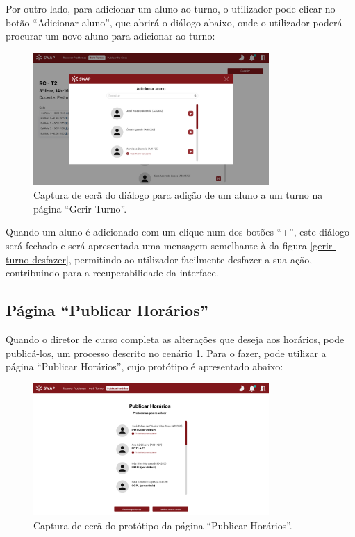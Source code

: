 \documentclass[12pt, a4paper]{article}
\begin{document}
Por outro lado, para adicionar um aluno ao turno, o utilizador pode clicar no botão
``Adicionar aluno'', que abrirá o diálogo abaixo, onde o utilizador poderá procurar um novo aluno
para adicionar ao turno:

\begin{figure}[H]
    \centering
    \includegraphics[width=0.8\textwidth]{res/prototype/gerir-turno-adicionar-aluno.png}
    \caption{
        \onehalfspacing
        Captura de ecrã do diálogo para adição de um aluno a um turno na página ``Gerir Turno''.
    }
    \label{gerir-turno-desfazer-adicionar-aluno}
\end{figure}

Quando um aluno é adicionado com um clique num dos botões ``+'', este diálogo será fechado e será
apresentada uma mensagem semelhante à da figura \ref{gerir-turno-desfazer}, permitindo ao utilizador
facilmente desfazer a sua ação, contribuindo para a recuperabilidade da interface.

\subsection{Página ``Publicar Horários''}

Quando o diretor de curso completa as alterações que deseja aos horários, pode publicá-los, um
processo descrito no cenário 1. Para o fazer, pode utilizar a página ``Publicar Horários'', cujo
protótipo é apresentado abaixo:

\begin{figure}[H]
    \centering
    \includegraphics[width=0.8\textwidth]{res/prototype/publicar-horarios.png}
    \caption{Captura de ecrã do protótipo da página ``Publicar Horários''.}
    \label{publicar-horarios}
\end{figure}
\end{document}
